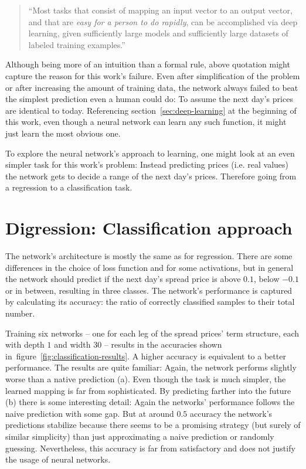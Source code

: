 \begin{quote}
	``Most tasks that consist of mapping an	input vector to an output vector, and that are \emph{easy for a person to do rapidly}, can	be accomplished via deep learning, given sufficiently large models and sufficiently	large datasets of labeled training examples.''\cite[p.\,167]{Goodfellow-et-al-2016}
\end{quote}

Although being more of an intuition than a formal rule, above quotation might capture the reason for this work's failure. Even after simplification of the problem or after increasing the amount of training data, the network always failed to beat the simplest prediction even a human could do: To assume the next day's prices are identical to today.
Referencing section~\ref{sec:deep-learning} at the beginning of this work, even though a neural network can learn any such function, it might just learn the most obvious one.

To explore the neural network's approach to learning, one might look at an even simpler task for this work's problem: Instead predicting prices (i.e. real values) the network gets to decide a range of the next day's prices. Therefore going from a regression to a classification task.

\section{Digression: Classification approach}

The network's architecture is mostly the same as for regression. There are some differences in the choice of loss function and for some activations, but in general the network should predict if the next day's spread price is above $0.1$, below $-0.1$ or in between, resulting in three classes. The network's performance is captured by calculating its accuracy: the ratio of correctly classified samples to their total number.

Training six networks -- one for each leg of the spread prices' term structure, each with depth $1$ and width $30$ -- results in the accuracies shown in~figure~\ref{fig:classification-results}. A higher accuracy is equivalent to a better performance.
The results are quite familiar: Again, the network performs slightly worse than a native prediction (a). Even though the task is much simpler, the learned mapping is far from sophisticated. By predicting farther into the future (b) there is some interesting detail: Again the networks' performance follows the naive prediction with some gap. But at around $0.5$ accuracy the network's predictions stabilize because there seems to be a promising strategy (but surely of similar simplicity) than just approximating a naive prediction or randomly guessing. Nevertheless, this accuracy is far from satisfactory and does not justify the usage of neural networks.

